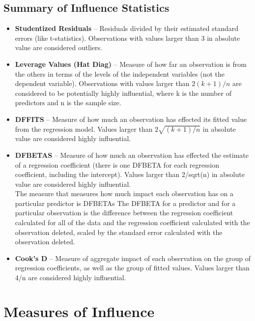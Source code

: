 \documentclass[12pt, a4paper]{report}
\begin{document}



\subsection{Summary of Influence Statistics}
\begin{itemize}
\item	\textbf{Studentized Residuals} – Residuals divided by their estimated standard errors (like t-statistics). Observations with values larger than 3 in absolute value are considered outliers.
\item	\textbf{Leverage Values (Hat Diag)} – Measure of how far an observation is from the others in terms of the levels of the independent variables (not the dependent variable). Observations with values larger than $2(k+1)/n$ are considered to be potentially highly influential, where k is the number of predictors and n is the sample size.
\item	\textbf{DFFITS} – Measure of how much an observation has effected its fitted value from the regression model. Values larger than $2\sqrt{(k+1)/n}$ in absolute value are considered highly influential. %
\item	\textbf{DFBETAS} – Measure of how much an observation has effected the estimate of a regression coefficient (there is one DFBETA for each regression coefficient, including the intercept). Values larger than 2/sqrt(n) in absolute value are considered highly influential.
				\\
				The measure that measures how much impact each observation has on a particular predictor is DFBETAs The DFBETA for a predictor and for a particular observation is the difference between the regression coefficient calculated for all of the data and the regression coefficient calculated with the observation deleted, scaled by the standard error calculated with the observation deleted. 
				
\item	\textbf{Cook’s D} – Measure of aggregate impact of each observation on the group of regression coefficients, as well as the group of fitted values. Values larger than 4/n are considered highly influential.
\end{itemize}
			
\section{Measures of Influence} %
\end{document}

